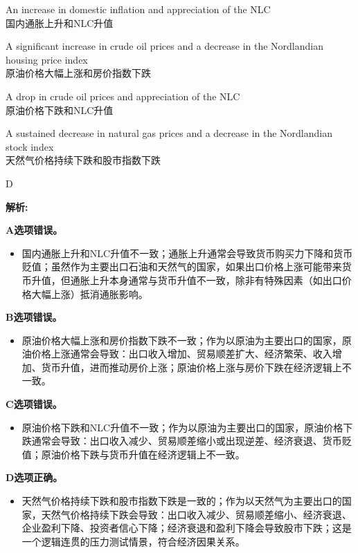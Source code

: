 \documentclass{article}
\newenvironment{explanation}
{\textbf{解析:}\par}
{\par}
\begin{document}
\begin{choices}
    \item An increase in domestic inflation and appreciation of the NLC\\
    国内通胀上升和NLC升值
    \item A significant increase in crude oil prices and a decrease in the Nordlandian housing price index\\
    原油价格大幅上涨和房价指数下跌
    \item A drop in crude oil prices and appreciation of the NLC\\
    原油价格下跌和NLC升值
    \item A sustained decrease in natural gas prices and a decrease in the Nordlandian stock index\\
    天然气价格持续下跌和股市指数下跌
\end{choices}

\begin{correctanswer}
    D
\end{correctanswer}

\begin{explanation}
    \textbf{A选项错误。}
    \begin{itemize}
        \item 国内通胀上升和NLC升值不一致；通胀上升通常会导致货币购买力下降和货币贬值；虽然作为主要出口石油和天然气的国家，如果出口价格上涨可能带来货币升值，但通胀上升本身通常与货币升值不一致，除非有特殊因素（如出口价格大幅上涨）抵消通胀影响。
    \end{itemize}

    \textbf{B选项错误。}
    \begin{itemize}
        \item 原油价格大幅上涨和房价指数下跌不一致；作为以原油为主要出口的国家，原油价格上涨通常会导致：出口收入增加、贸易顺差扩大、经济繁荣、收入增加、货币升值，进而推动房价上涨；原油价格上涨与房价下跌在经济逻辑上不一致。
    \end{itemize}

    \textbf{C选项错误。}
    \begin{itemize}
        \item 原油价格下跌和NLC升值不一致；作为以原油为主要出口的国家，原油价格下跌通常会导致：出口收入减少、贸易顺差缩小或出现逆差、经济衰退、货币贬值；原油价格下跌与货币升值在经济逻辑上不一致。
    \end{itemize}

    \textbf{D选项正确。}
    \begin{itemize}
        \item 天然气价格持续下跌和股市指数下跌是一致的；作为以天然气为主要出口的国家，天然气价格持续下跌会导致：出口收入减少、贸易顺差缩小、经济衰退、企业盈利下降、投资者信心下降；经济衰退和盈利下降会导致股市下跌；这是一个逻辑连贯的压力测试情景，符合经济因果关系。
    \end{itemize}
\end{explanation}
\end{document}
